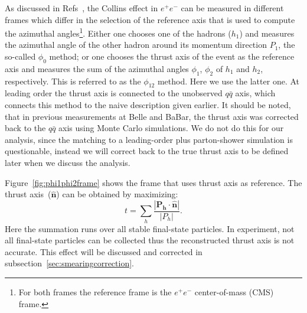 As discussed in Refs~\cite{BoerThesis, Boer:2008fr}, the Collins effect in $e^+e^-$ can be measured in different frames which differ in the selection of the reference axis that is used to compute the azimuthal angles\footnote{For both frames the reference frame is the $e^{+}e^{-}$ center-of-mass (CMS) frame.}. Either one chooses one of the hadrons ($h_1$) and measures the azimuthal angle of the other hadron around its momentum direction \(P_{1}\), the so-called $\phi_0$ method; or one chooses the thrust axis of the event as the reference axis and measures the sum of the azimuthal angles $\phi_1$, $\phi_2$ of $h_1$ and $h_2$, respectively. This is referred to as the $\phi_{12}$ method. Here we use the latter one. At leading order the thrust axis is connected to the unobserved $q \bar q$ axis, which connects this method to the naive description given earlier. It should be noted, that in previous measurements at Belle and BaBar, the thrust axis was corrected back to the $q \bar q$ axis using Monte Carlo simulations. We do not do this for our analysis, since the matching to a leading-order plus parton-shower simulation is questionable, instead we will correct back to the true thrust axis to be defined later when we discuss the analysis.

Figure~\ref{fig:phi1phi2frame} shows the frame that uses thrust axis as reference. The thrust axis~($\boldsymbol{\hat{n}}$) can be obtained by  maximizing:
\begin{equation}
\label{eq:thrust}
t=\sum_h\frac{|\boldsymbol{P_h\cdot\hat{n}}|}{|P_h|}.
\end{equation}
Here the summation runs over all stable final-state particles. In experiment, not all final-state particles can be collected thus the reconstructed thrust axis is not accurate. This effect will be discussed and corrected in subsection~\ref{sec:smearingcorrection}. 

